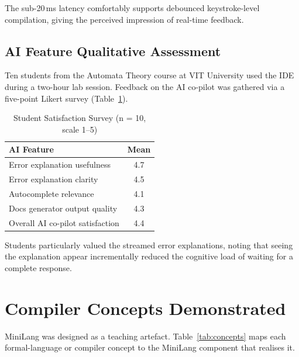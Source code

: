 \documentclass[conference]{IEEEtran}
\begin{document}
The sub-20\,ms latency comfortably supports debounced keystroke-level
compilation, giving the perceived impression of real-time feedback.

\subsection{AI Feature Qualitative Assessment}

Ten students from the Automata Theory course at VIT University used the
IDE during a two-hour lab session. Feedback on the AI co-pilot was
gathered via a five-point Likert survey (Table~\ref{tab:survey}).

\begin{table}[htbp]
\caption{Student Satisfaction Survey (n = 10, scale 1--5)}
\label{tab:survey}
\centering
\renewcommand{\arraystretch}{1.2}
\begin{tabular}{@{}lc@{}}
\toprule
\textbf{AI Feature} & \textbf{Mean} \\
\midrule
Error explanation usefulness       & 4.7 \\
Error explanation clarity          & 4.5 \\
Autocomplete relevance             & 4.1 \\
Docs generator output quality      & 4.3 \\
Overall AI co-pilot satisfaction   & 4.4 \\
\bottomrule
\end{tabular}
\end{table}

Students particularly valued the streamed error explanations, noting
that seeing the explanation appear incrementally reduced the cognitive
load of waiting for a complete response.

\section{Compiler Concepts Demonstrated}
\label{sec:concepts}

MiniLang was designed as a teaching artefact. Table~\ref{tab:concepts}
maps each formal-language or compiler concept to the MiniLang
component that realises it.
\end{document}
